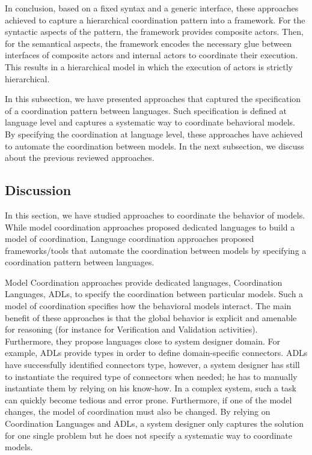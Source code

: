 In conclusion, based on a fixed syntax and a generic interface, these approaches achieved to capture a hierarchical coordination pattern into a framework. For the syntactic aspects of the pattern, the framework provides composite actors. Then, for the semantical aspects, the framework encodes the necessary glue between interfaces of composite actors and internal actors to coordinate their execution. This results in a hierarchical model in which the execution of actors is strictly hierarchical.

In this subsection, we have presented approaches that captured the specification of a coordination pattern between languages. Such specification is defined at language level and captures a systematic way to coordinate behavioral models. By specifying the coordination at language level, these approaches have achieved to automate the coordination between models. In the next subsection, we discuss about the previous reviewed approaches.   

\subsection{Discussion}
In this section, we have studied approaches to coordinate the behavior of models. While model coordination approaches proposed dedicated languages to build a model of coordination, Language coordination approaches proposed frameworks/tools that automate the coordination between models by specifying a coordination pattern between languages. 

Model Coordination approaches provide dedicated languages, \ie Coordination Languages, ADLs, to specify the coordination between particular models. Such a model of coordination specifies how the behavioral models interact. The main benefit of these approaches is that the global behavior is explicit and amenable for reasoning (for instance for Verification and Validation activities). Furthermore, they propose languages close to system designer domain. For example, ADLs provide types in order to define domain-specific connectors. ADLs have successfully identified connectors type, however, a system designer has still to instantiate the required type of connectors when needed; he has to manually instantiate them by relying on his know-how. In a complex system, such a task can quickly become tedious and error prone. Furthermore, if one of the model changes, the model of coordination must also be changed. By relying on Coordination Languages and ADLs, a system designer only captures the solution for one single problem but he does not specify a systematic way to coordinate models. 

